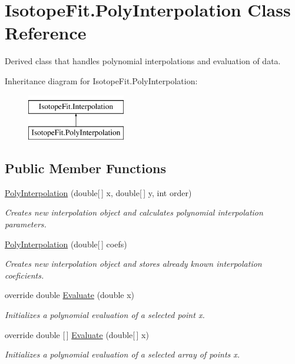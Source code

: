 \hypertarget{class_isotope_fit_1_1_poly_interpolation}{}\section{Isotope\+Fit.\+Poly\+Interpolation Class Reference}
\label{class_isotope_fit_1_1_poly_interpolation}


Derived class that handles polynomial interpolations and evaluation of data.  


Inheritance diagram for Isotope\+Fit.\+Poly\+Interpolation\+:\begin{figure}[H]
\begin{center}
\leavevmode
\includegraphics[height=2.000000cm]{class_isotope_fit_1_1_poly_interpolation}
\end{center}
\end{figure}
\subsection*{Public Member Functions}
\begin{DoxyCompactItemize}
\item 
\hyperlink{class_isotope_fit_1_1_poly_interpolation_a0ad4d407eb80baf6c38b3b752048e285}{Poly\+Interpolation} (double\mbox{[}$\,$\mbox{]} x, double\mbox{[}$\,$\mbox{]} y, int order)
\begin{DoxyCompactList}\small\item\em Creates new interpolation object and calculates polynomial interpolation parameters. \end{DoxyCompactList}\item 
\hyperlink{class_isotope_fit_1_1_poly_interpolation_afb26a6b07ac8ca8fb710682c437f6d7f}{Poly\+Interpolation} (double\mbox{[}$\,$\mbox{]} coefs)
\begin{DoxyCompactList}\small\item\em Creates new interpolation object and stores already known interpolation coeficients. \end{DoxyCompactList}\item 
override double \hyperlink{class_isotope_fit_1_1_poly_interpolation_a9638e5613d8a6537b73db6fe37ccd9e8}{Evaluate} (double x)
\begin{DoxyCompactList}\small\item\em Initializes a polynomial evaluation of a selected point x. \end{DoxyCompactList}\item 
override double \mbox{[}$\,$\mbox{]} \hyperlink{class_isotope_fit_1_1_poly_interpolation_ad6c5b40f7a718d934c5a3ed7f55c5eb3}{Evaluate} (double\mbox{[}$\,$\mbox{]} x)
\begin{DoxyCompactList}\small\item\em Initializes a polynomial evaluation of a selected array of points x. \end{DoxyCompactList}\end{DoxyCompactItemize}
